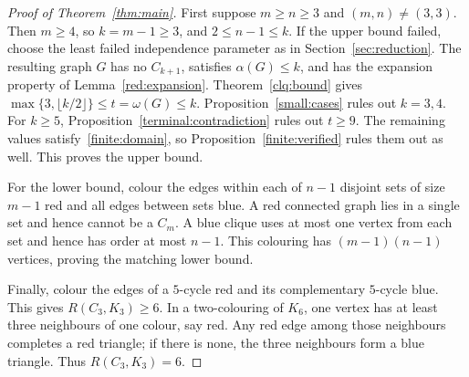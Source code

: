 \begin{proof}[Proof of Theorem~\ref{thm:main}]
First suppose $m\ge n\ge3$ and $(m,n)\ne(3,3)$.
Then $m\ge4$, so $k=m-1\ge3$, and $2\le n-1\le k$.
If the upper bound failed, choose the least failed independence
parameter as in Section~\ref{sec:reduction}. The resulting graph $G$
has no $C_{k+1}$, satisfies $\alpha(G)\le k$, and has the expansion
property of Lemma~\ref{red:expansion}.
Theorem~\ref{clq:bound} gives
$\max\{3,\lfloor k/2\rfloor\}\le t=\omega(G)\le k$.
Proposition~\ref{small:cases} rules out $k=3,4$.
For $k\ge5$, Proposition~\ref{terminal:contradiction} rules out $t\ge9$.
The remaining values satisfy~\eqref{finite:domain}, so
Proposition~\ref{finite:verified} rules them out as well.
This proves the upper bound.

For the lower bound, colour the edges within each of $n-1$ disjoint
sets of size $m-1$ red and all edges between sets blue. A red connected
graph lies in a single set and hence cannot be a $C_m$. A blue clique
uses at most one vertex from each set and hence has order at most
$n-1$. This colouring has $(m-1)(n-1)$ vertices, proving the matching
lower bound.

Finally, colour the edges of a $5$-cycle red and its complementary
$5$-cycle blue. This gives $R(C_3,K_3)\ge6$. In a two-colouring of
$K_6$, one vertex has at least three neighbours of one colour, say red.
Any red edge among those neighbours completes a red triangle; if there
is none, the three neighbours form a blue triangle. Thus
$R(C_3,K_3)=6$.
\end{proof}
